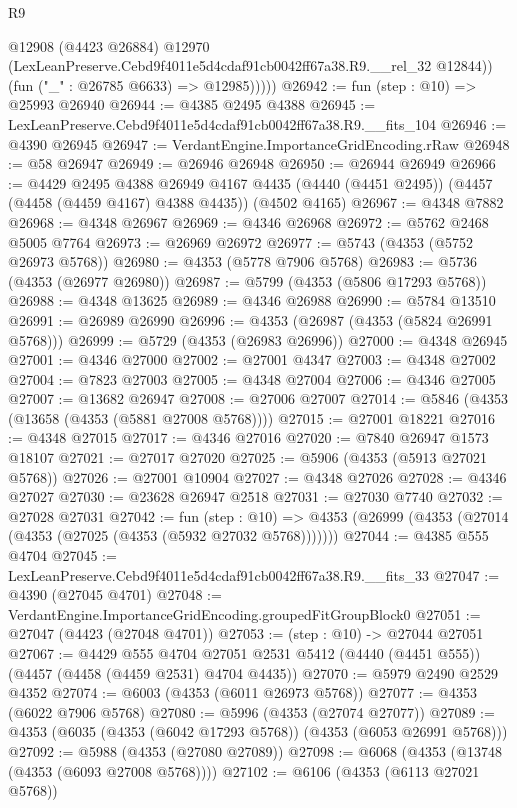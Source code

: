 \begin{lexlean}{R9}
\begin{coremodule}
              @12908
              (@4423 @26884)
              @12970
              (LexLeanPreserve.Cebd9f4011e5d4cdaf91cb0042ff67a38.R9.__rel_32 @12844))
            (fun ("_" : @26785 @6633) => @12985)))))
@26942 := fun (step : @10) => @25993 @26940
@26944 := @4385 @2495 @4388
@26945 := LexLeanPreserve.Cebd9f4011e5d4cdaf91cb0042ff67a38.R9.__fits_104
@26946 := @4390 @26945
@26947 := VerdantEngine.ImportanceGridEncoding.rRaw
@26948 := @58 @26947
@26949 := @26946 @26948
@26950 := @26944 @26949
@26966 := @4429
    @2495
    @4388
    @26949
    @4167
    @4435
    (@4440 (@4451 @2495))
    (@4457 (@4458 (@4459 @4167) @4388 @4435))
    (@4502 @4165)
@26967 := @4348 @7882
@26968 := @4348 @26967
@26969 := @4346 @26968
@26972 := @5762 @2468 @5005 @7764
@26973 := @26969 @26972
@26977 := @5743 (@4353 (@5752 @26973 @5768))
@26980 := @4353 (@5778 @7906 @5768)
@26983 := @5736 (@4353 (@26977 @26980))
@26987 := @5799 (@4353 (@5806 @17293 @5768))
@26988 := @4348 @13625
@26989 := @4346 @26988
@26990 := @5784 @13510
@26991 := @26989 @26990
@26996 := @4353 (@26987 (@4353 (@5824 @26991 @5768)))
@26999 := @5729 (@4353 (@26983 @26996))
@27000 := @4348 @26945
@27001 := @4346 @27000
@27002 := @27001 @4347
@27003 := @4348 @27002
@27004 := @7823 @27003
@27005 := @4348 @27004
@27006 := @4346 @27005
@27007 := @13682 @26947
@27008 := @27006 @27007
@27014 := @5846 (@4353 (@13658 (@4353 (@5881 @27008 @5768))))
@27015 := @27001 @18221
@27016 := @4348 @27015
@27017 := @4346 @27016
@27020 := @7840 @26947 @1573 @18107
@27021 := @27017 @27020
@27025 := @5906 (@4353 (@5913 @27021 @5768))
@27026 := @27001 @10904
@27027 := @4348 @27026
@27028 := @4346 @27027
@27030 := @23628 @26947 @2518
@27031 := @27030 @7740
@27032 := @27028 @27031
@27042 := fun (step : @10) =>
  @4353 (@26999 (@4353 (@27014 (@4353 (@27025 (@4353 (@5932 @27032 @5768)))))))
@27044 := @4385 @555 @4704
@27045 := LexLeanPreserve.Cebd9f4011e5d4cdaf91cb0042ff67a38.R9.__fits_33
@27047 := @4390 (@27045 @4701)
@27048 := VerdantEngine.ImportanceGridEncoding.groupedFitGroupBlock0
@27051 := @27047 (@4423 (@27048 @4701))
@27053 := (step : @10) -> @27044 @27051
@27067 := @4429
    @555
    @4704
    @27051
    @2531
    @5412
    (@4440 (@4451 @555))
    (@4457 (@4458 (@4459 @2531) @4704 @4435))
@27070 := @5979 @2490 @2529 @4352
@27074 := @6003 (@4353 (@6011 @26973 @5768))
@27077 := @4353 (@6022 @7906 @5768)
@27080 := @5996 (@4353 (@27074 @27077))
@27089 := @4353 (@6035 (@4353 (@6042 @17293 @5768)) (@4353 (@6053 @26991 @5768)))
@27092 := @5988 (@4353 (@27080 @27089))
@27098 := @6068 (@4353 (@13748 (@4353 (@6093 @27008 @5768))))
@27102 := @6106 (@4353 (@6113 @27021 @5768))

\end{coremodule}
\end{lexlean}
